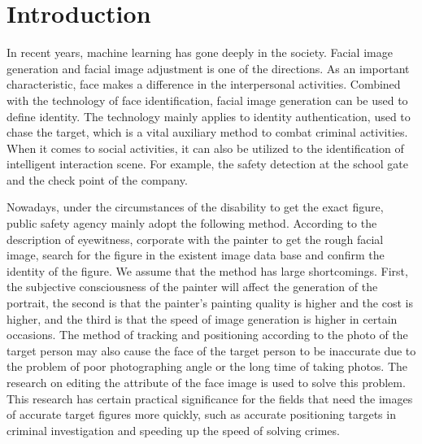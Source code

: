 \section{Introduction}

In recent years, machine learning has gone deeply in the society.
Facial image generation and facial image adjustment is one of the directions.
As an important characteristic, face makes a difference in the interpersonal activities.
Combined with the technology of face identification, facial image generation can be used to define identity.
The technology mainly applies to identity authentication, used to chase the target, which is a vital auxiliary method to combat criminal activities.
When it comes to social activities, it can also be utilized to the identification of intelligent interaction scene.
For example, the safety detection at the school gate and the check point of the company.

Nowadays, under the circumstances of the disability to get the exact figure,
    public safety agency mainly adopt the following method.
According to the description of eyewitness, corporate with the painter to get the rough facial image,
    search for the figure in the existent image data base and confirm the identity of the figure.
We assume that the method has large shortcomings.
First, the subjective consciousness of the painter will affect the generation of the portrait,
    the second is that the painter's painting quality is higher and the cost is higher,
    and the third is that the speed of image generation is higher in certain occasions.
The method of tracking and positioning according to the photo of the target person may also cause the face of the target person to be inaccurate due to the problem of poor photographing angle or the long time of taking photos.
The research on editing the attribute of the face image is used to solve this problem.
This research has certain practical significance for the fields that need the images of accurate target figures more quickly,
    such as accurate positioning targets in criminal investigation and speeding up the speed of solving crimes.